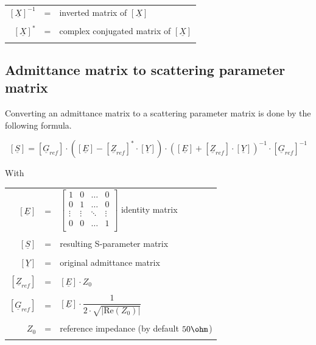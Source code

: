 \documentclass[10pt]{report}
\begin{document}
\begin{tabular}{rll}
$\left[\underline{X}\right]^{-1}$ & = &
inverted matrix of $\left[\underline{X}\right]$\\& &\\
$\left[\underline{X}\right]^{*}$ & = & 
complex conjugated matrix of $\left[\underline{X}\right]$\\& &\\
\end{tabular}

\subsection{Admittance matrix to scattering parameter matrix}

Converting an admittance matrix to a scattering parameter matrix is
done by the following formula.

\begin{equation}
\left[
\underline{S}
\right]
=
\left[
\underline{G}_{ref}
\right]
\cdot
\left(
\left[\underline{E}\right] - \left[\underline{Z}_{ref}\right]^{*} \cdot \left[\underline{Y}\right]
\right)
\cdot
\left(
\left[\underline{E}\right] + \left[\underline{Z}_{ref}\right] \cdot \left[\underline{Y}\right]
\right)^{-1}
\cdot
\left[\underline{G}_{ref}\right]^{-1}
\end{equation}

With

\addvspace{12pt}

\begin{tabular}{rll}
$\left[\underline{E}\right]$ & = &
$\begin{bmatrix}
1 & 0 & \ldots & 0\\
0 & 1 & \ldots & 0\\
\vdots & \vdots & \ddots & \vdots\\
0 & 0 & \ldots & 1\\
\end{bmatrix}$
identity matrix\\& &\\
$\left[\underline{S}\right]$ & = & resulting S-parameter matrix\\& &\\
$\left[\underline{Y}\right]$ & = & original admittance matrix\\& &\\
$\left[\underline{Z}_{ref}\right]$ & = &
$\left[\underline{E}\right] \cdot Z_{0}$\\& &\\
$\left[\underline{G}_{ref}\right]$ & = &
$\left[\underline{E}\right] \cdot 
\dfrac{1}{2\cdot \sqrt{\left| \text{Re}\left(Z_{0}\right)\right|}}$\\& &\\
$Z_{0}$ & = & reference impedance (by default $50\ohm$)\\& &\\
\end{tabular}
\end{document}
